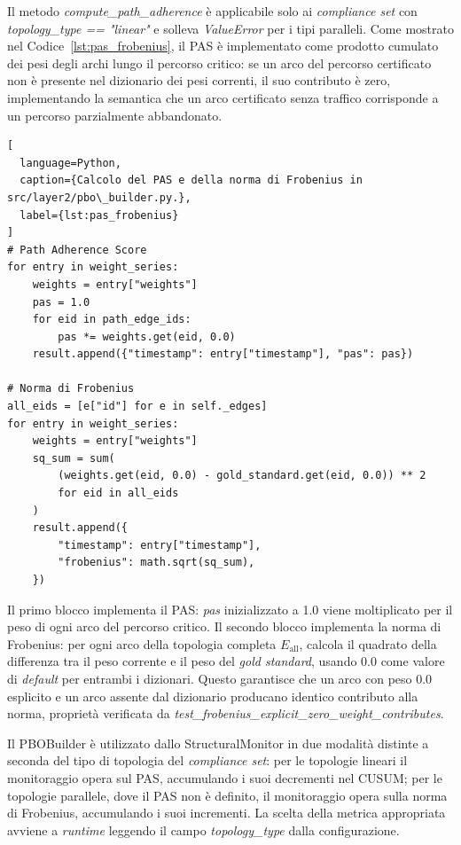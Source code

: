 Il metodo \textit{compute\_path\_adherence} è applicabile solo ai \textit{compliance set} con
\textit{topology\_type == "linear"} e solleva \textit{ValueError} per i tipi paralleli. Come
mostrato nel Codice~\ref{lst:pas_frobenius}, il \gls{PAS} è implementato come prodotto cumulato
dei pesi degli archi lungo il percorso critico: se un arco del percorso certificato non è
presente nel dizionario dei pesi correnti, il suo contributo è zero, implementando la semantica
che un arco certificato senza traffico corrisponde a un percorso parzialmente abbandonato.

\begin{lstlisting}[
  language=Python,
  caption={Calcolo del PAS e della norma di Frobenius in src/layer2/pbo\_builder.py.},
  label={lst:pas_frobenius}
]
# Path Adherence Score
for entry in weight_series:
    weights = entry["weights"]
    pas = 1.0
    for eid in path_edge_ids:
        pas *= weights.get(eid, 0.0)
    result.append({"timestamp": entry["timestamp"], "pas": pas})

# Norma di Frobenius
all_eids = [e["id"] for e in self._edges]
for entry in weight_series:
    weights = entry["weights"]
    sq_sum = sum(
        (weights.get(eid, 0.0) - gold_standard.get(eid, 0.0)) ** 2
        for eid in all_eids
    )
    result.append({
        "timestamp": entry["timestamp"],
        "frobenius": math.sqrt(sq_sum),
    })
\end{lstlisting}

Il primo blocco implementa il \gls{PAS}: \textit{pas} inizializzato a 1.0 viene moltiplicato
per il peso di ogni arco del percorso critico. Il secondo blocco implementa la norma di
Frobenius: per ogni arco della topologia completa $E_{\text{all}}$, calcola il quadrato della
differenza tra il peso corrente e il peso del \textit{gold standard}, usando 0.0 come valore di
\textit{default} per entrambi i dizionari. Questo garantisce che un arco con peso 0.0 esplicito
e un arco assente dal dizionario producano identico contributo alla norma, proprietà verificata
da \textit{test\_frobenius\_explicit\_zero\_weight\_contributes}.

Il PBOBuilder è utilizzato dallo StructuralMonitor in due modalità distinte a seconda del tipo di
topologia del \textit{compliance set}: per le topologie lineari il monitoraggio opera sul \gls{PAS},
accumulando i suoi decrementi nel \gls{CUSUM}; per le topologie parallele, dove il \gls{PAS} non
è definito, il monitoraggio opera sulla norma di Frobenius, accumulando i suoi incrementi. La
scelta della metrica appropriata avviene a \textit{runtime} leggendo il campo
\textit{topology\_type} dalla configurazione.

